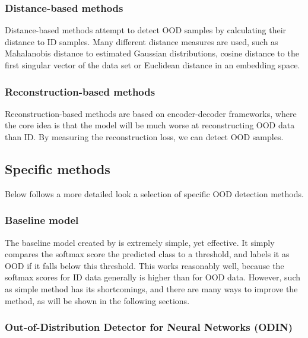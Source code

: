 \documentclass[conference]{IEEEtran}
\begin{document}
\subsubsection{Distance-based methods}

Distance-based methods attempt to detect OOD samples by calculating their distance to ID samples. Many different distance measures are used, such as Mahalanobis distance to estimated Gaussian distributions, cosine distance to the first singular vector of the data set or Euclidean distance in an embedding space.
\\

\subsubsection{Reconstruction-based methods}

Reconstruction-based methods are based on encoder-decoder frameworks, where the core idea is that the model will be much worse at reconstructing OOD data than ID. By measuring the reconstruction loss, we can detect OOD samples.
\\

\subsection{Specific methods} \label{ood_specific}

Below follows a more detailed look a selection of specific OOD detection methods.

\subsubsection{Baseline model} \label{ood_baseline}

The baseline model created by \cite{oodbaseline} is extremely simple, yet effective. It simply compares the softmax score the predicted class to a threshold, and labels it as OOD if it falls below this threshold. This works reasonably well, because the softmax scores for ID data generally is higher than for OOD data. However, such as simple method has its shortcomings, and there are many ways to improve the method, as will be shown in the following sections.
\\

\subsubsection{Out-of-Distribution Detector for Neural Networks (ODIN)} \label{ood_odin}
\end{document}
